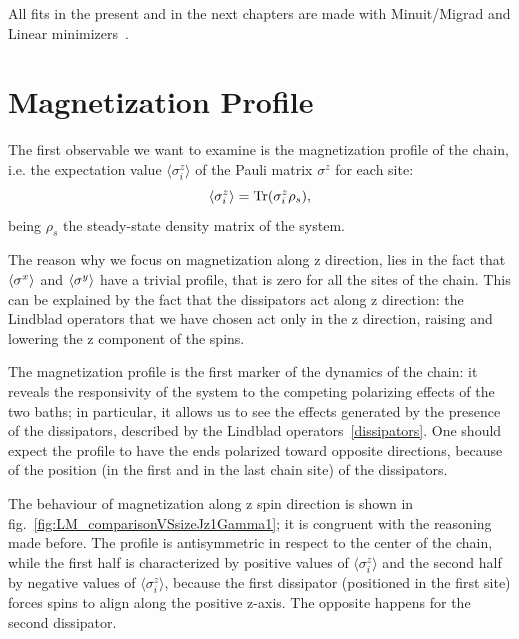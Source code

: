 All fits in the present and in the next chapters are made with Minuit/Migrad and Linear minimizers~\cite{root_cern}.

\section{Magnetization Profile}
\label{sec:magn_profile}
The first observable we want to examine is the magnetization profile of the chain, i.e. the expectation value $\langle \sigma_i^z \rangle$ of the Pauli matrix $\sigma^z$ for each site:
\begin{equation*}
    \langle \sigma_i^z \rangle = \operatorname{Tr}(\sigma_i^z \rho_s),
\end{equation*}
being $\rho_s$ the steady-state density matrix of the system.

The reason why we focus on magnetization along z direction, lies in the fact that $\braket{\sigma^x}$ and $\braket{\sigma^y}$ have a trivial profile, that is zero for all the sites of the chain. This can be explained by the fact that the dissipators act along z direction: the Lindblad operators that we have chosen act only in the z direction, raising and lowering the z component of the spins.

The magnetization profile is the first marker of the dynamics of the chain:  it reveals the responsivity of the system to the competing polarizing effects of the two baths; in particular, it allows us to see the effects generated by the presence of the dissipators, described by the Lindblad operators~\ref{dissipators}. One should expect the profile to have the ends polarized toward opposite directions, because of the position (in the first and in the last chain site) of the dissipators.

The behaviour of magnetization along z spin direction is shown in fig.~\ref{fig:LM_comparisonVSsizeJz1Gamma1}; it is congruent with the reasoning made before. The profile is antisymmetric in respect to the center of the chain, while the first half is characterized by positive values of  $\langle \sigma_i^z \rangle$ and the second half by negative values of $\langle \sigma_i^z \rangle$, because the first dissipator (positioned in the first site) forces spins to align along the positive z-axis. The opposite happens for the second dissipator.


